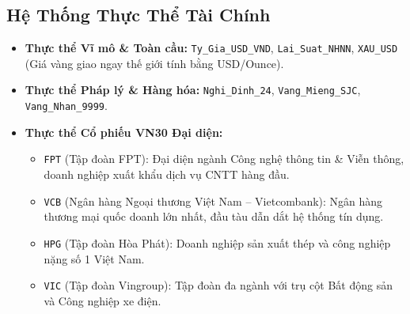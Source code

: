 \documentclass[12pt,a4paper]{report}
\begin{document}
\subsection{Hệ Thống Thực Thể Tài Chính}
\begin{itemize}
    \item \textbf{Thực thể Vĩ mô \& Toàn cầu:} \texttt{Ty\_Gia\_USD\_VND}, \texttt{Lai\_Suat\_NHNN}, \texttt{XAU\_USD} (Giá vàng giao ngay thế giới tính bằng USD/Ounce).
    \item \textbf{Thực thể Pháp lý \& Hàng hóa:} \texttt{Nghi\_Dinh\_24}, \texttt{Vang\_Mieng\_SJC}, \texttt{Vang\_Nhan\_9999}.
    \item \textbf{Thực thể Cổ phiếu VN30 Đại diện:}
    \begin{itemize}
        \item \texttt{FPT} (Tập đoàn FPT): Đại diện ngành Công nghệ thông tin \& Viễn thông, doanh nghiệp xuất khẩu dịch vụ CNTT hàng đầu.
        \item \texttt{VCB} (Ngân hàng Ngoại thương Việt Nam -- Vietcombank): Ngân hàng thương mại quốc doanh lớn nhất, đầu tàu dẫn dắt hệ thống tín dụng.
        \item \texttt{HPG} (Tập đoàn Hòa Phát): Doanh nghiệp sản xuất thép và công nghiệp nặng số 1 Việt Nam.
        \item \texttt{VIC} (Tập đoàn Vingroup): Tập đoàn đa ngành với trụ cột Bất động sản và Công nghiệp xe điện.
    \end{itemize}
\end{itemize}

\newpage
\end{document}
